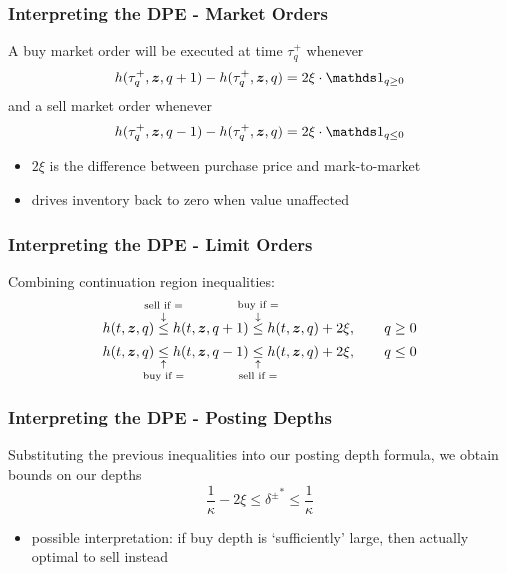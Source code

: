 \begin{frame}
\frametitle{Interpreting the DPE - Market Orders}
A buy market order will be executed at time $\tau^+_q$ whenever
\[
h(\tau^+_q, \bz, q+1) - h(\tau^+_q,\bz,q) = 2 \xi \cdot \indicator_{q \geq 0}
\]
and a sell market order whenever
\[
h(\tau^+_q, \bz, q-1) - h(\tau^+_q,\bz,q) = 2 \xi \cdot \indicator_{q \leq 0}
\]
\begin{itemize}
\item $2\xi$ is the difference between purchase price and mark-to-market
\item drives inventory back to zero when value unaffected
\end{itemize}
\end{frame}

\begin{frame}
\frametitle{Interpreting the DPE - Limit Orders}
Combining continuation region inequalities:
\[ h(t,\bz,q) \overset{\text{\makebox[0pt]{sell if =}}}{\overset{\downarrow}{\leq}} h(t,\bz,q+1) \overset{\text{\makebox[0pt]{buy if =}}}{\overset{\downarrow}{\leq}} h(t,\bz,q) + 2\xi, \qquad q \geq 0 \] 
\[ h(t,\bz,q) \underset{\text{\makebox[0pt]{buy if =}}}{\underset{\uparrow}{\leq}} h(t,\bz,q-1) \underset{\text{\makebox[0pt]{sell if =}}}{\underset{\uparrow}{\leq}} h(t,\bz,q) + 2\xi, \qquad q \leq 0 \]
\end{frame}

\begin{frame}
\frametitle{Interpreting the DPE - Posting Depths}
Substituting the previous inequalities into our posting depth formula, we obtain bounds on our depths
\[ \frac{1}{\kappa} - 2\xi  \leq {\delta^\pm}^* \leq \frac{1}{\kappa} \]
\begin{itemize}
\item possible interpretation: if buy depth is `sufficiently' large, then actually optimal to sell instead
\end{itemize}
\end{frame}